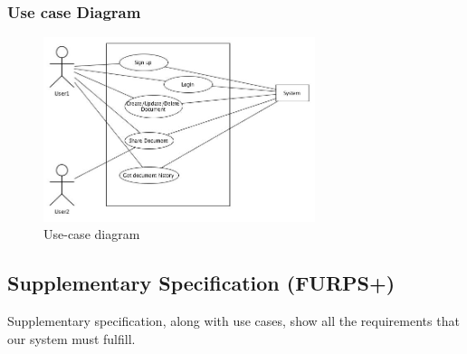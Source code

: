 \documentclass[11pt]{article}
\begin{document}
\subsubsection{Use case Diagram}
\label{sec-2-1-1}
\begin{figure}[H]
  		\centering
    	\includegraphics[width=300px]{images/UpdatedUsecaseDiagram.jpg}
    	\caption{Use-case diagram}
	\end{figure}
\subsection{Supplementary Specification (FURPS+)}
\label{sec-2-2}
Supplementary specification, along with use cases, show all the requirements that our system must fulfill.
\end{document}

